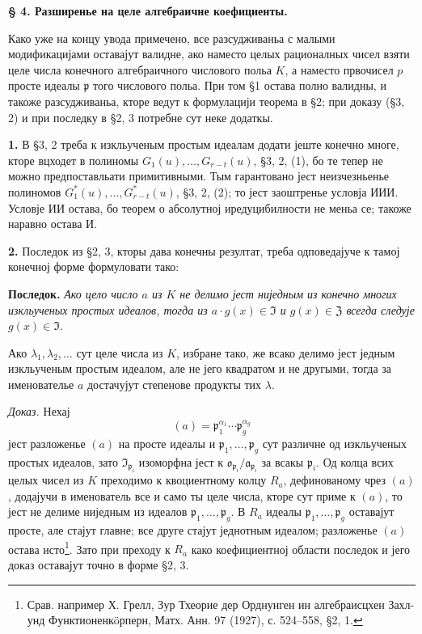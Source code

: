 \documentclass[11pt]{article}
\begin{document}
\bigskip
\noindent\textbf{§ 4. Разширенье на целе алгебраичне коефициенты.}

\smallskip
Како уже на концу увода примечено, все разсудживаньа с малыми модификацијами оставајут валидне, ако наместо целых рационалных чисел взяти целе числа конечного алгебраичного числового польа \(K\), а наместо првочисел \(p\) просте идеалы \(\mathfrak{p}\) того числового польа. При том §1 остава полно валидны, и такоже разсудживаньа, кторе ведут к формулацији теорема в §2; при доказу (§3, 2) и при последку в §2, 3 потребне сут неке додаткы.

\medskip\noindent\textbf{1.}
В §3, 2 треба к изкльученым простым идеалам додати јеште конечно многе, кторе вцходет в полиномы \(G_1(u),\ldots,G_{r-t}(u)\), §3, 2, (1), бо те тепер не можно предпоставльати примитивными. Тым гарантовано јест неизчезньенье полиномов \(G^*_1(u),\ldots,G^*_{r-t}(u)\), §3, 2, (2); то јест заоштренье условја ИИИ. Условје ИИ остава, бо теорем о абсолутној иредуцибилности не меньа се; такоже наравно остава И.

\medskip\noindent\textbf{2.}
Последок из §2, 3, кторы дава конечны резултат, треба одповедајуче к тамој конечној форме формуловати тако:

\noindent\textbf{Последок.}
\textit{Ако цело число \(a\) из \(K\) не делимо јест ниједным из конечно многих изкльученых простых идеалов, тогда из \(a\cdot g(x)\in\mathfrak{I}\) и \(g(x)\in\mathfrak{Z}\) всегда следује \(g(x)\in\mathfrak{I}\).}

Ако \(\lambda_1,\lambda_2,\ldots\) сут целе числа из \(K\), избране тако, же всако делимо јест једным изкльученым простым идеалом, але не јего квадратом и не другыми, тогда за именователье \(a\) достачујут степенове продукты тих \(\lambda\).

\noindent\textit{Доказ.}
Нехај
\[
(a)=\mathfrak{p}_1^{\alpha_1}\cdots\mathfrak{p}_g^{\alpha_g}
\]
јест разложенье \((a)\) на просте идеалы и \(\mathfrak{p}_1,\ldots,\mathfrak{p}_g\) сут различне од изкльученых простых идеалов, зато \(\mathfrak{I}_{\mathfrak{p}_i}\) изоморфна јест к \(\mathfrak{o}_{\mathfrak{p}_i}/\mathfrak{a}_{\mathfrak{p}_i}\) за всакы \(\mathfrak{p}_i\). Од колца всих целых чисел из \(K\) преходимо к квоциентному колцу \(R_a\), дефинованому чрез \((a)\), додајучи в именователь все и само ты целе числа, кторе сут приме к \((a)\), то јест не делиме ниједным из идеалов \(\mathfrak{p}_1,\ldots,\mathfrak{p}_g\). В \(R_a\) идеалы \(\mathfrak{p}_1,\ldots,\mathfrak{p}_g\) оставајут просте, але стајут главне; все друге стајут једнотным идеалом; разложенье \((a)\) остава исто\footnote{Срав. например Х. Грелл, Зур Тхеорие дер Орднунген ин алгебраисцхен Захл- унд Функтионенкöрперн, Матх. Анн. 97 (1927), с. 524--558, §2, 1.}. Зато при преходу к \(R_a\) како коефициентној области последок и јего доказ оставајут точно в форме §2, 3.
\end{document}
